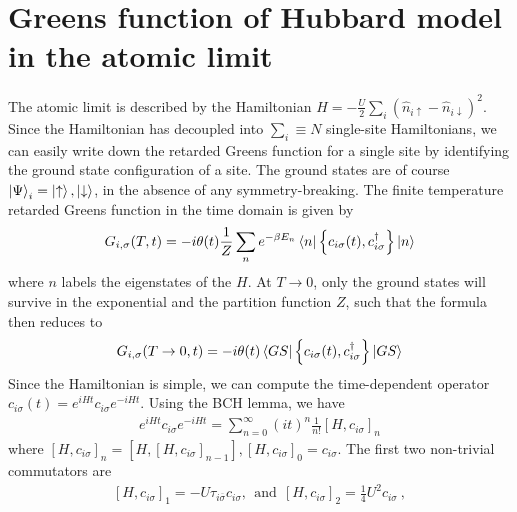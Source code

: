 \documentclass[prb]{revtex4-2}
\begin{document}
\section{Greens function of Hubbard model in the atomic limit}
\label{atomic limit}
The atomic limit is described by the Hamiltonian \(H = -\frac{U}{2}\sum_i\left(\hat n_{i \uparrow} - \hat n_{i \downarrow}\right)^2\). Since the Hamiltonian has decoupled into \(\sum_i \equiv N\) single-site Hamiltonians, we can easily write down the retarded Greens function for a single site by identifying the ground state configuration of a site. The ground states are of course \(\ket{\Psi}_i = \ket{\uparrow},\ket{\downarrow}\), in the absence of any symmetry-breaking. The finite temperature retarded Greens function in the time domain is given by
\begin{equation}\begin{aligned}
	G_{i,\sigma}(T,t) = -i\theta(t) \frac{1}{Z}\sum_n e^{-\beta E_n} \braket{n | \left\{c_{i\sigma}(t),c^\dagger_{i\sigma}\right\} | n}
\end{aligned}\end{equation}
where \(n\) labels the eigenstates of the \(H\). At \(T \to 0\), only the ground states will survive in the exponential and the partition function \(Z\), such that the formula then reduces to
\begin{equation}\begin{aligned}
G_{i,\sigma}(T \to 0,t) = -i\theta(t)\braket{GS | \left\{c_{i\sigma}(t),c^\dagger_{i\sigma}\right\} | GS}
\end{aligned}\end{equation}
Since the Hamiltonian is simple, we can compute the time-dependent operator \(c_{i\sigma}(t) = e^{iH t} c_{i\sigma} e^{-iHt}\). Using the BCH lemma, we have
\begin{equation}\begin{aligned}
	e^{iH t} c_{i\sigma} e^{-iHt} = \sum_{n=0}^\infty \left(it\right)^n \frac{1}{n!}\left[H,c_{i\sigma}\right]_n
\end{aligned}\end{equation}
where \(\left[H,c_{i\sigma}\right]_n = \left[H,\left[H,c_{i\sigma}\right]_{n-1}\right],\left[H,c_{i\sigma}\right]_0=c_{i\sigma}\). The first two non-trivial commutators are
\begin{equation}\begin{aligned}
	\left[H, c_{i\sigma}\right]_1 = -U \tau_{i\overline\sigma}c_{i\sigma},~ ~\text{and} ~~\left[H, c_{i\sigma}\right]_2 = \frac{1}{4}U^2 c_{i\sigma}~,
\end{aligned}\end{equation}
\end{document}
